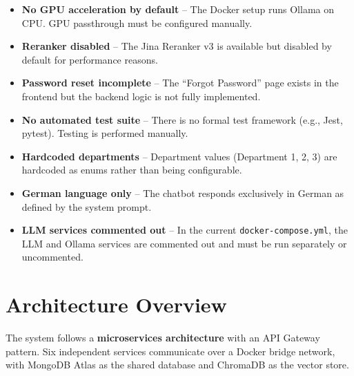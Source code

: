 \documentclass[a4paper,12pt]{report}
\begin{document}
\begin{itemize}
    \item \textbf{No GPU acceleration by default} -- The Docker setup runs Ollama on CPU. GPU passthrough must be configured manually.
    \item \textbf{Reranker disabled} -- The Jina Reranker v3 is available but disabled by default for performance reasons.
    \item \textbf{Password reset incomplete} -- The ``Forgot Password'' page exists in the frontend but the backend logic is not fully implemented.
    \item \textbf{No automated test suite} -- There is no formal test framework (e.g., Jest, pytest). Testing is performed manually.
    \item \textbf{Hardcoded departments} -- Department values (Department 1, 2, 3) are hardcoded as enums rather than being configurable.
    \item \textbf{German language only} -- The chatbot responds exclusively in German as defined by the system prompt.
    \item \textbf{LLM services commented out} -- In the current \texttt{docker-compose.yml}, the LLM and Ollama services are commented out and must be run separately or uncommented.
\end{itemize}

\section{Architecture Overview}

The system follows a \textbf{microservices architecture} with an API Gateway pattern. Six independent services communicate over a Docker bridge network, with MongoDB Atlas as the shared database and ChromaDB as the vector store.
\end{document}
